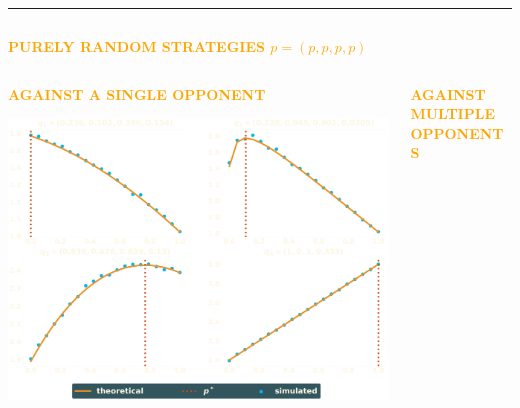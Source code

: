 \documentclass[usenames,dvipsnames,t]{beamer}
\begin{document}
\hrule height 3pt
\vspace{1cm}
\begin{columns}
    \begin{column}{.7\linewidth}
        \begin{center}
            \textcolor{orange}{\textbf{\Large{PURELY RANDOM STRATEGIES \boldmath\(p=(p, p, p, p)\)}}}
        \end{center}

    \begin{columns}
        \begin{column}{.5\linewidth}
            \begin{center}
            \vspace{-1cm}

            \textcolor{orange}{\textbf{\small{AGAINST A SINGLE OPPONENT}}}
            \vspace{2cm}

            
            \vspace{1.5cm}

            \includegraphics[width=.7\textwidth]{static/matches}
            \end{center}
        \end{column}
        \begin{column}{.5\linewidth}
            \begin{center}
                \vspace{-1cm}
    
                \textcolor{orange}{\textbf{\small{AGAINST MULTIPLE OPPONENTS}}}
                \vspace{1.5cm}
    
                
                \vspace{-.5cm}
                

\end{center}
\end{column}
\end{columns}
\end{column}
\end{columns}
\end{document}
